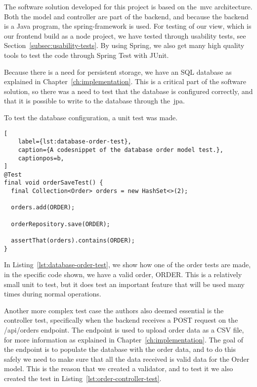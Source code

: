 The software solution developed for this project is based on the~\acrfull{mvc} architecture.
Both the model and controller are part of the backend, and because the backend is a Java program,
the spring-framework is used.
For testing of our view, which is our frontend build as a node project, we have tested through usability tests,
see Section~\ref{subsec:usability-tests}.
By using Spring, we also get many high quality tools to test the code through Spring Test with JUnit.

Because there is a need for persistent storage, we have an SQL database as explained in Chapter~\ref{ch:implementation}.
This is a critical part of the software solution, so there was a need to test that the database is configured
correctly, and that it is possible to write to the database through the~\acrfull{jpa}.

To test the database configuration, a unit test was made.


\begin{lstlisting}[
    label={lst:database-order-test},
    caption={A codesnippet of the database order model test.},
    captionpos=b,
]
@Test
final void orderSaveTest() {
  final Collection<Order> orders = new HashSet<>(2);

  orders.add(ORDER);

  orderRepository.save(ORDER);

  assertThat(orders).contains(ORDER);
}
\end{lstlisting}

In Listing~\ref{lst:database-order-test}, we show how one of the order tests are made, in the specific code shown,
we have a valid order, ORDER\@.
This is a relatively small unit to test, but it does test an important feature that will be used many times
during normal operations.

Another more complex test case the authors also deemed essential is the controller test, specifically when
the backend receives a POST request on the /api/orders endpoint.
The endpoint is used to upload order data as a CSV file, for more information as explained in
Chapter~\ref{ch:implementation}.
The goal of the endpoint is to populate the database with the order data, and to do this safely we need
to make sure that all the data received is valid data for the Order model.
This is the reason that we created a validator, and to test it we also created the test in
Listing~\ref{lst:order-controller-test}.

